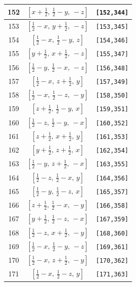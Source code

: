 \documentclass[fleqn,8pt]{jsarticle}
\begin{document}
\begin{longtable}{ccc}
152 & $\left[ x + \frac{1}{2},\, \frac{1}{2} - y,\, - z \right]$ & {\tt [152,344]} \\ \hline
153 & $\left[ \frac{1}{2} - x,\, y + \frac{1}{2},\, - z \right]$ & {\tt [153,345]} \\ \hline
154 & $\left[ \frac{1}{2} - x,\, \frac{1}{2} - y,\, z \right]$ & {\tt [154,346]} \\ \hline
155 & $\left[ y + \frac{1}{2},\, x + \frac{1}{2},\, - z \right]$ & {\tt [155,347]} \\ \hline
156 & $\left[ \frac{1}{2} - y,\, \frac{1}{2} - x,\, - z \right]$ & {\tt [156,348]} \\ \hline
157 & $\left[ \frac{1}{2} - x,\, z + \frac{1}{2},\, y \right]$ & {\tt [157,349]} \\ \hline
158 & $\left[ \frac{1}{2} - x,\, \frac{1}{2} - z,\, - y \right]$ & {\tt [158,350]} \\ \hline
159 & $\left[ z + \frac{1}{2},\, \frac{1}{2} - y,\, x \right]$ & {\tt [159,351]} \\ \hline
160 & $\left[ \frac{1}{2} - z,\, \frac{1}{2} - y,\, - x \right]$ & {\tt [160,352]} \\ \hline
161 & $\left[ z + \frac{1}{2},\, x + \frac{1}{2},\, y \right]$ & {\tt [161,353]} \\ \hline
162 & $\left[ y + \frac{1}{2},\, z + \frac{1}{2},\, x \right]$ & {\tt [162,354]} \\ \hline
163 & $\left[ \frac{1}{2} - y,\, z + \frac{1}{2},\, - x \right]$ & {\tt [163,355]} \\ \hline
164 & $\left[ \frac{1}{2} - z,\, \frac{1}{2} - x,\, y \right]$ & {\tt [164,356]} \\ \hline
165 & $\left[ \frac{1}{2} - y,\, \frac{1}{2} - z,\, x \right]$ & {\tt [165,357]} \\ \hline
166 & $\left[ z + \frac{1}{2},\, \frac{1}{2} - x,\, - y \right]$ & {\tt [166,358]} \\ \hline
167 & $\left[ y + \frac{1}{2},\, \frac{1}{2} - z,\, - x \right]$ & {\tt [167,359]} \\ \hline
168 & $\left[ \frac{1}{2} - z,\, x + \frac{1}{2},\, - y \right]$ & {\tt [168,360]} \\ \hline
169 & $\left[ \frac{1}{2} - x,\, \frac{1}{2} - y,\, - z \right]$ & {\tt [169,361]} \\ \hline
170 & $\left[ \frac{1}{2} - x,\, z + \frac{1}{2},\, - y \right]$ & {\tt [170,362]} \\ \hline
171 & $\left[ \frac{1}{2} - x,\, \frac{1}{2} - z,\, y \right]$ & {\tt [171,363]} \\ \hline

\end{longtable}
\end{document}
